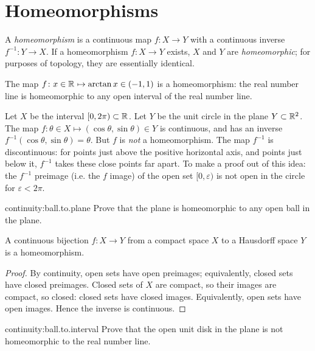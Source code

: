 \section{Homeomorphisms}
A \emph{homeomorphism} is a continuous map \(f \colon X \to Y\) with a continuous inverse \(f^{-1} \colon Y \to X\).
If a homeomorphism \(f \colon X \to Y\) exists, \(X\) and \(Y\) are \emph{homeomorphic}; for purposes of topology, they are essentially identical.
\begin{example}
The map \(f \colon x \in \mathbb{R}^{} \mapsto \arctan x \in (-1,1)\) is a homeomorphism: the real number line is homeomorphic to any open interval of the real number line.
\end{example}
\begin{example}
Let \(X\) be the interval \([0,2 \pi) \subset \mathbb{R}^{}\).
Let \(Y\) be the unit circle in the plane \(Y \subset \mathbb{R}^{2}\).
The map \(f \colon \theta \in X \mapsto (\cos \theta, \sin \theta) \in Y\) is continuous, and has an inverse \(f^{-1}(\cos \theta, \sin \theta)=\theta\).
But \(f\) is \emph{not} a homeomorphism.
The map \(f^{-1}\) is discontinuous: for points just above the positive horizontal axis, and points just below it, \(f^{-1}\) takes these close points far apart.
To make a proof out of this idea: the \(f^{-1}\) preimage (i.e. the \(f\) image) of the open set \([0,\varepsilon)\) is not open in the circle for \(\varepsilon < 2 \pi\).
\end{example}
\begin{problem}{continuity:ball.to.plane}
Prove that the plane is homeomorphic to any open ball in the plane.
\end{problem}
\begin{theorem}\label{theorem:continuous.bijection}
A continuous bijection \(f \colon X \to Y\) from a compact space \(X\) to a Hausdorff space \(Y\) is a homeomorphism.
\end{theorem}
\begin{proof}
By continuity, open sets have open preimages; equivalently, closed sets have closed preimages.
Closed sets of \(X\) are compact, so their images are compact, so closed: closed sets have closed images.
Equivalently, open sets have open images.
Hence the inverse is continuous.
\end{proof}
\begin{problem}{continuity:ball.to.interval}
Prove that the open unit disk in the plane is not homeomorphic to the real number line.
\end{problem}

